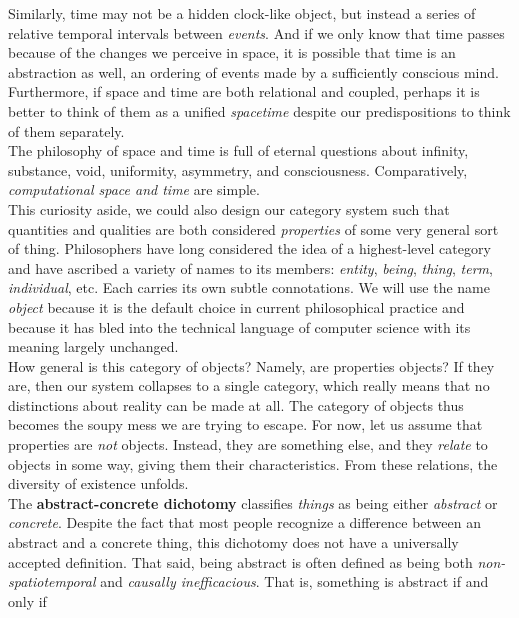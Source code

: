 Similarly, time may not be a hidden clock-like object, but instead a series of relative temporal intervals between \textit{events}. And if we only know that time passes because of the changes we perceive in space, it is possible that time is an abstraction as well, an ordering of events made by a sufficiently conscious mind. Furthermore, if space and time are both relational and coupled, perhaps it is better to think of them as a unified \textit{spacetime} despite our predispositions to think of them separately. \\

The philosophy of space and time is full of eternal questions about infinity, substance, void, uniformity, asymmetry, and consciousness. Comparatively, \textit{computational space and time} are simple. \\

This curiosity aside, we could also design our category system such that quantities and qualities are both considered \textit{properties} of some very general sort of thing. Philosophers have long considered the idea of a highest-level category and have ascribed a variety of names to its members: \textit{entity}, \textit{being}, \textit{thing}, \textit{term}, \textit{individual}, etc. Each carries its own subtle connotations. We will use the name \textit{object} because it is the default choice in current philosophical practice and because it has bled into the technical language of computer science with its meaning largely unchanged. \\

How general is this category of objects? Namely, are properties objects? If they are, then our system collapses to a single category, which really means that no distinctions about reality can be made at all. The category of objects thus becomes the soupy mess we are trying to escape. For now, let us assume that properties are \textit{not} objects. Instead, they are something else, and they \textit{relate} to objects in some way, giving them their characteristics. From these relations, the diversity of existence unfolds. \\

The \textbf{abstract-concrete dichotomy} classifies \textit{things} as being either \textit{abstract} or \textit{concrete}. Despite the fact that most people recognize a difference between an abstract and a concrete thing, this dichotomy does not have a universally accepted definition. That said, being abstract is often defined as being both \textit{non-spatiotemporal} and \textit{causally inefficacious}. That is, something is abstract if and only if 

